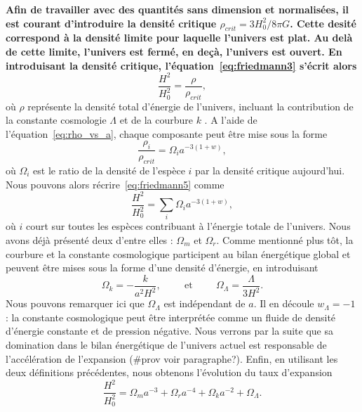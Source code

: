 \documentclass[11pt, twoside, a4paper, openright]{report}
\begin{document}
\textbf{Afin de travailler avec des quantités sans dimension et normalisées, il est courant d'introduire la densité critique $\rho_{crit} = 3 H_0^2 / 8 \pi G$. Cette desité correspond à la densité limite pour laquelle l'univers est plat. Au delà de cette limite, l'univers est fermé, en deçà, l'univers est ouvert. En introduisant la densité critique, l'équation~\ref{eq:friedmann3} s'écrit alors}
\begin{equation}
  \label{eq:friedmann5}
  \frac{H^2}{H_0^2} = \frac{\rho}{\rho_{crit}} ,
\end{equation}
où $\rho$ représente la densité total d'énergie de l'univers, incluant la contribution de la constante cosmologie $\Lambda$ et de la courbure $k$ . A l'aide de l'équation~\ref{eq:rho_vs_a}, chaque composante peut être mise sous la forme
\begin{equation}
  \label{eq:def_omgega}
  \frac{\rho_i}{\rho_{crit}} = \Omega_i a^{-3 (1+w)} , 
\end{equation}
où $\Omega_i$ est le ratio de la densité de l'espèce $i$ par la densité critique aujourd'hui. Nous pouvons alors récrire~\ref{eq:friedmann5} comme
\begin{equation}
  \label{eq:friedmann6}
  \frac{H^2}{H_0^2} = \sum_i \Omega_i a^{-3 (1+w)} ,
\end{equation}
où $i$ court sur toutes les espèces contribuant à l'énergie totale de l'univers. Nous avons déjà présenté deux d'entre elles : $\Omega_m$ et $\Omega_r$. Comme mentionné plus tôt, la courbure et la constante cosmologique participent au bilan énergétique global et peuvent être mises sous la forme d'une densité d'énergie, en introduisant
\begin{equation}
  \label{eq:omega_lambda}
  \Omega_{k} = - \frac{k}{a^2 H^2} , \hspace{1cm} \textrm{et} \hspace{1cm} \Omega_{\Lambda} = \frac{\Lambda}{3 H^2} .
\end{equation}
Nous pouvons remarquer ici que $\Omega_{\Lambda}$ est indépendant de $a$. Il en découle $w_{\Lambda} = -1$ : la constante cosmologique peut être interprétée comme un fluide de densité d'énergie constante et de pression négative. Nous verrons par la suite que sa domination dans le bilan énergétique de l'univers actuel est responsable de l'accélération de l'expansion (\#prov voir paragraphe?).
Enfin, en utilisant les deux définitions précédentes, nous obtenons l'évolution du taux d'expansion
\begin{equation}
  \label{eq:friedmann7}
  \frac{H^2}{H_0^2} = \Omega_m a^{-3} + \Omega_r a^{-4} + \Omega_k a^{-2} + \Omega_{\Lambda}.
\end{equation}
\end{document}
